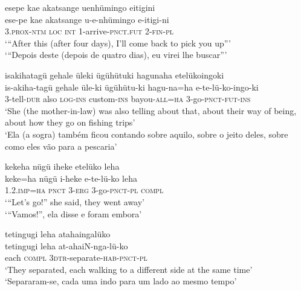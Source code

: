 \documentclass[output=paper,
modfonts,nonflat
]{langsci/langscibook}
\begin{document}
\ea esepe kae akatsange uenhümingo eitigini{\footnotemark}  \\[.3em]
\gll ese-pe		kae	akatsange	u-e-nhümingo		e-itigi-ni \\
3.\textsc{prox-ntm} 	\textsc{loc}	\textsc{int} 		1-arrive-\textsc{pnct.fut}	2-\textsc{fin-pl} \\
\glt ‘“After this (after four days), I’ll come back to pick you up”’ \\
‘“Depois deste (depois de quatro dias), eu virei lhe buscar”’ \\
\z

\ea isakihatagü gehale üleki ügühütuki hagunaha etelükoingoki \\[.3em]
\gll is-akiha-tagü	gehale	üle-ki		ügühütu-ki	hagu-na=ha	e-te-lü-ko-ingo-ki \\
3-tell-\textsc{dur}	also	\textsc{log-ins}	custom-\textsc{ins}	bayou-\textsc{all=ha}	3-go-\textsc{pnct-fut-ins} \\
\glt ‘She (the mother-in-law) was also telling about that, about their way of being, about how they go on fishing trips’ \\
‘Ela (a sogra) também ficou contando sobre aquilo, sobre o jeito deles, sobre como eles vão para a pescaria’ \\
\z

\largerpage[2]
\ea kekeha nügü iheke etelüko leha \\[.3em]
\gll keke=ha	nügü	i-heke	e-te-lü-ko	leha \\
1.2.\textsc{imp=ha}	\textsc{pnct}	3-\textsc{erg}	3-go-\textsc{pnct-pl}	\textsc{compl} \\
\glt ‘“Let’s go!” she said, they went away’ \\
‘“Vamos!”, ela disse e foram embora’ \\
\z


\ea tetingugi leha atahaingalüko \\[.3em]
\gll tetingugi	leha	at-ahaiN-nga-lü-ko \\
each		\textsc{compl}	3\textsc{dtr}-separate-\textsc{hab-pnct-pl} \\
\glt ‘They separated, each walking to a different side at the same time’ \\
‘Separaram-se, cada uma indo para um lado ao mesmo tempo’ 
\z
\end{document}
